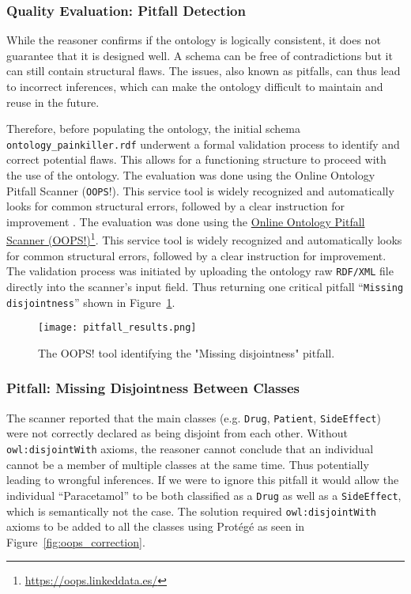 \subsubsection*{Quality Evaluation: Pitfall Detection}
While the reasoner confirms if the ontology is logically consistent, it does not guarantee that it is designed well. A schema can be free of contradictions but it can still contain structural flaws. The issues, also known as pitfalls, can thus lead to incorrect inferences, which can make the ontology difficult to maintain and reuse in the future.


Therefore, before populating the ontology,  the initial schema  \nolinkurl{ontology_painkiller.rdf} underwent a formal validation process to identify and correct potential flaws. This allows for a functioning structure to proceed with the use of the ontology. The evaluation was done using the Online Ontology Pitfall Scanner (\texttt{OOPS}!). This service tool is widely recognized and  automatically looks for common structural errors, followed by a clear instruction for improvement \cite{oopsWebsite}.
The evaluation was done using the \href{https://oops.linkeddata.es/}{Online Ontology Pitfall Scanner (OOPS!)}\footnote{\url{https://oops.linkeddata.es/}}. This service tool is widely recognized and automatically looks for common structural errors, followed by a clear instruction for improvement.
The validation process was initiated by uploading the ontology raw \texttt{RDF/XML} file directly into the scanner’s input field. Thus returning one critical pitfall ``\texttt{Missing disjointness}'' shown in Figure~\ref{fig:oops_pitfall}.

\begin{figure}[H]
\centering
\texttt{[image: pitfall\_results.png]} %
\caption{The OOPS! tool identifying the "Missing disjointness" pitfall.}
\label{fig:oops_pitfall}
\end{figure}

\subsubsection*{Pitfall: Missing Disjointness Between Classes}
The scanner reported that the main classes (e.g. \texttt{Drug}, \texttt{Patient}, \texttt{SideEffect}) were not correctly declared as being disjoint from each other. Without \texttt{owl:disjointWith} axioms, the reasoner cannot conclude that an individual cannot be a member of multiple classes at the same time. Thus potentially leading to wrongful inferences. If we were to ignore this pitfall it would allow the individual “Paracetamol” to be both classified as a \texttt{Drug} as well as a \texttt{SideEffect}, which is semantically not the case. The solution required \texttt{owl:disjointWith} axioms to be added to all the classes using Protégé as seen in Figure~\ref{fig:oops_correction}.

